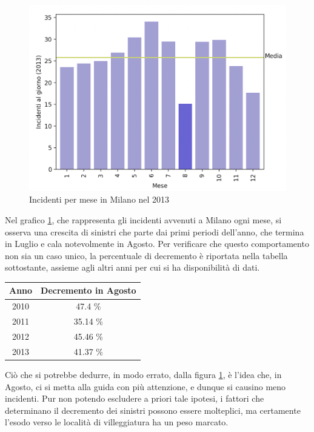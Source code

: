 \documentclass[a4paper,12pt]{report}
\begin{document}
\begin{figure}
    \hfill\includegraphics[width=0.7\linewidth]{../src/incidenti/incidenti_senza_coords/mese_incidenti/milano_mese.png}\hspace*{\fill}
    \caption{Incidenti per mese in Milano nel 2013}
    \label{fig:milano-mese}
\end{figure}

Nel grafico \ref{fig:milano-mese}, che rappresenta gli incidenti avvenuti a Milano ogni mese, 
si osserva una crescita di sinistri che parte dai primi periodi 
dell'anno, che termina in Luglio e cala notevolmente in Agosto. 
Per verificare che questo comportamento non sia 
un caso unico, la percentuale di decremento è riportata nella tabella sottostante, 
assieme agli altri anni per cui si ha disponibilità di dati. 

\begin{center}
    \def\arraystretch{1.5}%
    \begin{tabular}{ |c|c| } 
        \hline
        Anno & Decremento in Agosto \\ 
        \hline
        2010 & 47.4 \%  \\ 
        \rowcolor{TableGray}
        2011 & 35.14 \% \\
        2012 & 45.46 \% \\
        \rowcolor{TableGray}
        2013 & 41.37 \% \\
        \hline
    \end{tabular}
\end{center}

Ciò che si potrebbe dedurre, in modo errato, dalla figura \ref{fig:milano-mese}, 
è l'idea che, in Agosto, ci si metta alla guida con più attenzione, 
e dunque si causino meno incidenti. 
Pur non potendo escludere a priori tale ipotesi, i fattori che determinano 
il decremento dei sinistri possono essere molteplici, 
ma certamente l'esodo verso le località di villeggiatura ha un peso marcato.
\end{document}
